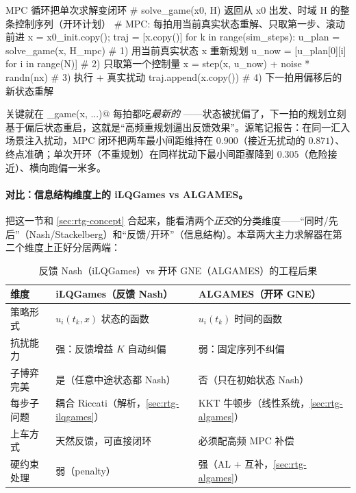 \begin{codebox}[Python]{MPC 循环把单次求解变闭环}
# solve_game(x0, H) 返回从 x0 出发、时域 H 的整条控制序列（开环计划）
# MPC: 每拍用当前真实状态重解、只取第一步、滚动前进
x = x0_init.copy(); traj = [x.copy()]
for k in range(sim_steps):
    u_plan = solve_game(x, H_mpc)               # 1) 用当前真实状态 x 重新规划
    u_now  = [u_plan[0][i] for i in range(N)]   # 2) 只取第一个控制量
    x = step(x, u_now) + noise * randn(nx)      # 3) 执行 + 真实扰动
    traj.append(x.copy())                       # 4) 下一拍用偏移后的新状态重解
\end{codebox}

\noindent 关键就在 \verb@solve_game(x, ...)@ 每拍都吃\emph{最新的} \verb@x@——状态被扰偏了，下一拍的规划立刻基于偏后状态重启，这就是“高频重规划逼出反馈效果”。源笔记报告：在同一汇入场景注入扰动，MPC 闭环把两车最小间距维持在 $0.900$（接近无扰动的 $0.871$）、终点准确；单次开环（不重规划）在同样扰动下最小间距骤降到 $0.305$（危险接近）、横向跑偏一米多\cite{lecleach2022algames}。

\paragraph{对比：信息结构维度上的 iLQGames vs ALGAMES。}
把这一节和 \cref{sec:rtg-concept} 合起来，能看清两个\emph{正交}的分类维度——“同时/先后”（Nash/Stackelberg）和“反馈/开环”（信息结构）。本章两大主力求解器在第二个维度上正好分居两端：

\begin{table}[H]\centering\small
\caption{反馈 Nash（iLQGames）vs 开环 GNE（ALGAMES）的工程后果}
\label{tab:rtg-ilq-vs-alg-info}
\begin{tabular}{p{} p{} p{}}
\toprule
维度 & iLQGames（反馈 Nash） & ALGAMES（开环 GNE） \\
\midrule
策略形式 & $u_i(t_k,x)$ 状态的函数 & $u_i(t_k)$ 时间的函数 \\
抗扰能力 & 强：反馈增益 $K$ 自动纠偏 & 弱：固定序列不纠偏 \\
子博弈完美 & 是（任意中途状态都 Nash） & 否（只在初始状态 Nash） \\
每步子问题 & 耦合 Riccati（解析，\cref{sec:rtg-ilqgames}） & KKT 牛顿步（线性系统，\cref{sec:rtg-algames}） \\
上车方式 & 天然反馈，可直接闭环 & 必须配高频 MPC 补偿 \\
硬约束处理 & 弱（penalty） & 强（AL + 互补，\cref{sec:rtg-algames}） \\
\bottomrule
\end{tabular}
\end{table}

